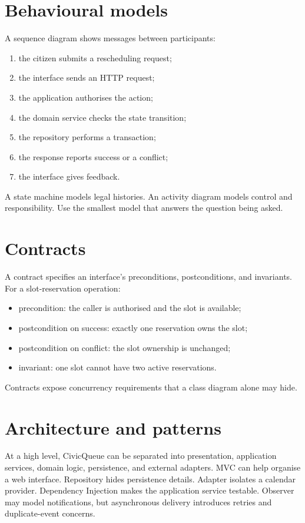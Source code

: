\section{Behavioural models}
A sequence diagram shows messages between participants:
\begin{enumerate}
\item the citizen submits a rescheduling request;
\item the interface sends an HTTP request;
\item the application authorises the action;
\item the domain service checks the state transition;
\item the repository performs a transaction;
\item the response reports success or a conflict;
\item the interface gives feedback.
\end{enumerate}
A state machine models legal histories. An activity diagram models control and responsibility. Use the smallest model that answers the question being asked.

\section{Contracts}
A contract specifies an interface's preconditions, postconditions, and invariants. For a slot-reservation operation:
\begin{itemize}
\item precondition: the caller is authorised and the slot is available;
\item postcondition on success: exactly one reservation owns the slot;
\item postcondition on conflict: the slot ownership is unchanged;
\item invariant: one slot cannot have two active reservations.
\end{itemize}
Contracts expose concurrency requirements that a class diagram alone may hide.

\section{Architecture and patterns}
At a high level, CivicQueue can be separated into presentation, application services, domain logic, persistence, and external adapters. MVC can help organise a web interface. Repository hides persistence details. Adapter isolates a calendar provider. Dependency Injection makes the application service testable. Observer may model notifications, but asynchronous delivery introduces retries and duplicate-event concerns.

